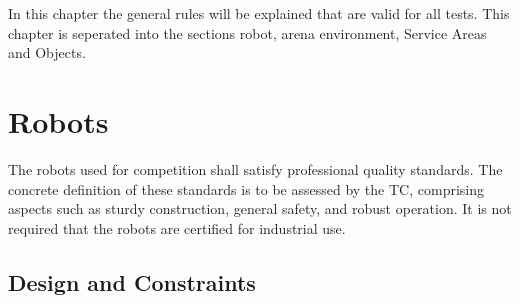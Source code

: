 
In this chapter the general rules will be explained that are valid for all tests. This chapter is seperated into the sections robot, arena environment, Service Areas and Objects.

%
%

\section{Robots}
The robots used for competition shall satisfy professional quality standards. The concrete definition of these standards is to be assessed by the TC, comprising aspects such as sturdy construction, general safety, and robust operation. It is not required that the robots are certified for industrial use.

\subsection{Design and Constraints} \label{ssec:RobotDesignAndConstraints}

